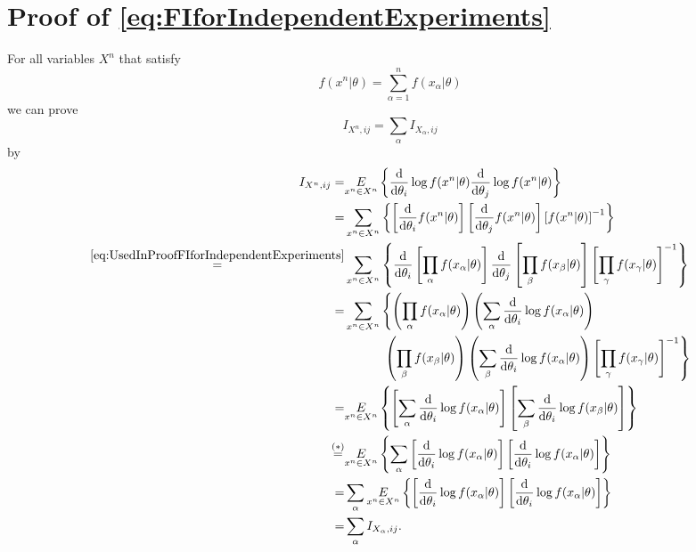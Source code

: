 \section{Proof of \cref{eq:FIforIndependentExperiments}}
\label{sec:ProofFIforIndependentExperiments}
For all variables $X^n$ that satisfy
\begin{equation}\label{eq:UsedInProofFIforIndependentExperiments}
	f(x^n|\theta) = \sum_{\alpha = 1}^n f(x_\alpha|\theta)
\end{equation} 
we can prove
\begin{equation}
	I_{X^n,ij} = \sum_\alpha I_{X_\alpha,ij}
\end{equation}
by
\begin{equation}
\begin{split}
	I_{X^n,ij} =& \underset{x^n \in X^n}{E} \left\{\frac{\mathrm{d}}{\mathrm{d}\theta_i}\log f(x^n|\theta) \frac{\mathrm{d}}{\mathrm{d}\theta_j}\log f(x^n|\theta)\right\}\\
	=& \sum_{x^n \in X^n} \left\{\left[\frac{\mathrm{d}}{\mathrm{d}\theta_i} f(x^n|\theta)\right] \left[\frac{\mathrm{d}}{\mathrm{d}\theta_j} f(x^n|\theta)\right]  \left[f(x^n|\theta)\right]^{-1} \right\}\\
	\stackrel{\ref{eq:UsedInProofFIforIndependentExperiments}}{=}& \sum_{x^n \in X^n} \left\{\frac{\mathrm{d}}{\mathrm{d}\theta_i} \left[\prod_\alpha f(x_\alpha|\theta)\right] \frac{\mathrm{d}}{\mathrm{d}\theta_j} \left[\prod_\beta f(x_\beta|\theta)\right] \left[ \prod_\gamma f(x_\gamma|\theta)\right]^{-1}\right\}\\
	=&\sum_{x^n \in X^n} \left\{\left(\prod_\alpha f(x_\alpha|\theta)\right)\left(\sum_\alpha \frac{\mathrm{d}}{\mathrm{d}\theta_i}\log f(x_\alpha|\theta)\right) \right. 
	\\
	&\qquad\quad\left.\left(\prod_\beta f(x_\beta|\theta)\right)\left(\sum_\beta \frac{\mathrm{d}}{\mathrm{d}\theta_i}\log f(x_\alpha|\theta)\right) \left[\prod_\gamma f(x_\gamma|\theta)\right]^{-1} \right\}\\
	=& \underset{x^n \in X^n}{E}\left\{ \left[\sum_\alpha\frac{\mathrm{d}}{\mathrm{d}\theta_i}\log f(x_\alpha|\theta)\right] \left[\sum_\beta\frac{\mathrm{d}}{\mathrm{d}\theta_i}\log f(x_\beta|\theta)\right]\right\}\\
	\stackrel{(*)}{=}& \underset{x^n \in X^n}{E} \left\{ \sum_\alpha \left[ \frac{\mathrm{d}}{\mathrm{d}\theta_i}\log f(x_\alpha|\theta)\right]\left[ \frac{\mathrm{d}}{\mathrm{d}\theta_i}\log f(x_\alpha|\theta)\right]\right\}\\
	=& \sum_\alpha \underset{x^n \in X^n}{E} \left\{\left[ \frac{\mathrm{d}}{\mathrm{d}\theta_i}\log f(x_\alpha|\theta)\right]\left[ \frac{\mathrm{d}}{\mathrm{d}\theta_i}\log f(x_\alpha|\theta)\right]\right\}\\
	=& \sum_\alpha I_{X_\alpha,ij}.
\end{split}
\end{equation}
